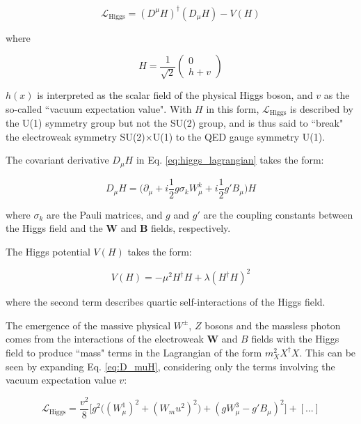 \begin{equation}
\label{eq:higgs_lagrangian}
\mathcal{L}_\text{Higgs} = (D^\mu H)^\dagger(D_\mu H) - V(H)
\end{equation}

\noindent where

\begin{equation}
H = \frac{1}{\sqrt{2}}
\begin{pmatrix}
0 \\
h+v
\end{pmatrix}
\end{equation}

 \(h(x)\) is interpreted as the scalar field of the physical Higgs boson, and \(v\) as the so-called ``vacuum expectation value". With \(H\) in this form, \(\mathcal{L}_\text{Higgs}\) is described by the U(1) symmetry group but not the SU(2) group, and is thus said to ``break" the electroweak symmetry SU(2)\(\times\)U(1) to the QED gauge symmetry U(1).

The covariant derivative \(D_\mu H\) in Eq. \ref{eq:higgs_lagrangian} takes the form:

\begin{equation}
\label{eq:D_muH}
D_\mu H = \big(\partial_\mu + i\frac{1}{2}g\sigma_k W^k_\mu+i\frac{1}{2}g'B_\mu\big)H
\end{equation}

\noindent where \(\sigma_k\) are the Pauli matrices, and \(g\) and \(g'\) are the coupling constants between the Higgs field and the \(\boldsymbol{W}\) and \(\boldsymbol{B}\) fields, respectively.

The Higgs potential \(V(H)\) takes the form:

\begin{equation}
V(H) = -\mu^2H^\dagger H + \lambda(H^\dagger H)^2
\end{equation}

\noindent where the second term describes quartic self-interactions of the Higgs field.

The emergence of the massive physical \(W^\pm\), \(Z\) bosons and the massless photon comes from the interactions of the electroweak \(\boldsymbol{W}\) and \(B\) fields with the Higgs field to produce ``mass" terms in the Lagrangian of the form \(m_X^2X^\dagger X\). This can be seen by expanding Eq. \ref{eq:D_muH}, considering only the terms involving the vacuum expectation value \(v\):

\begin{equation}
\label{eq:higgs_expanded}
\mathcal{L}_\text{Higgs} = \frac{v^2}{8}\Big[g^2\big((W^1_\mu)^2+(W_mu^2)^2\big) + (gW^3_\mu-g'B_\mu)^2\Big] + [...]
\end{equation}

